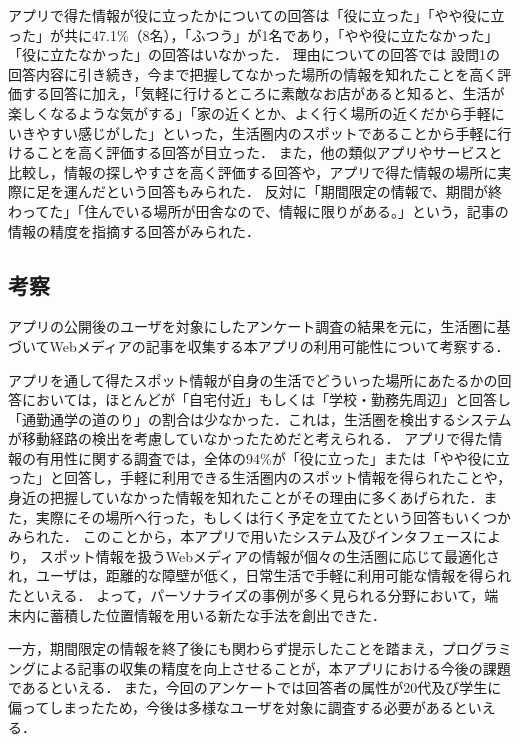 \documentclass[a4paper]{jsarticle}
\begin{document}
\begin{enumerate}
\begin{enumerate}
\begin{enumerate}
  アプリで得た情報が役に立ったかについての回答は「役に立った」「やや役に立った」が共に47.1\%（8名），「ふつう」が1名であり，「やや役に立たなかった」「役に立たなかった」の回答はいなかった．
  理由についての回答では
  設問1の回答内容に引き続き，今まで把握してなかった場所の情報を知れたことを高く評価する回答に加え，「気軽に行けるところに素敵なお店があると知ると、生活が楽しくなるような気がする」「家の近くとか、よく行く場所の近くだから手軽にいきやすい感じがした」といった，生活圏内のスポットであることから手軽に行けることを高く評価する回答が目立った．
  また，他の類似アプリやサービスと比較し，情報の探しやすさを高く評価する回答や，アプリで得た情報の場所に実際に足を運んだという回答もみられた．
  反対に「期間限定の情報で、期間が終わってた」「住んでいる場所が田舎なので、情報に限りがある。」という，記事の情報の精度を指摘する回答がみられた．



\end{enumerate}


\subsection{考察}
アプリの公開後のユーザを対象にしたアンケート調査の結果を元に，生活圏に基づいてWebメディアの記事を収集する本アプリの利用可能性について考察する．

アプリを通して得たスポット情報が自身の生活でどういった場所にあたるかの回答においては，ほとんどが「自宅付近」もしくは「学校・勤務先周辺」と回答し「通勤通学の道のり」の割合は少なかった．これは，生活圏を検出するシステムが移動経路の検出を考慮していなかったためだと考えられる．
アプリで得た情報の有用性に関する調査では，全体の94\%が「役に立った」または「やや役に立った」と回答し，手軽に利用できる生活圏内のスポット情報を得られたことや，身近の把握していなかった情報を知れたことがその理由に多くあげられた．また，実際にその場所へ行った，もしくは行く予定を立てたという回答もいくつかみられた．
このことから，本アプリで用いたシステム及びインタフェースにより，
スポット情報を扱うWebメディアの情報が個々の生活圏に応じて最適化され，ユーザは，距離的な障壁が低く，日常生活で手軽に利用可能な情報を得られたといえる．
よって，パーソナライズの事例が多く見られる分野において，端末内に蓄積した位置情報を用いる新たな手法を創出できた．

一方，期間限定の情報を終了後にも関わらず提示したことを踏まえ，プログラミングによる記事の収集の精度を向上させることが，本アプリにおける今後の課題であるといえる．
また，今回のアンケートでは回答者の属性が20代及び学生に偏ってしまったため，今後は多様なユーザを対象に調査する必要があるといえる．


\end{enumerate}
\end{enumerate}
\end{document}
